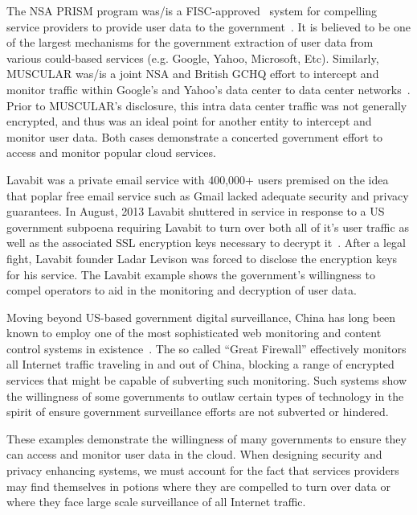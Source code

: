 \begin{packed_desc}
\item[PRISM and MUSCULAR:] The NSA PRISM program was/is a
  FISC-approved~\cite{fisc} system for compelling service providers to
  provide user data to the government~\cite{greenwald-prism}. It is
  believed to be one of the largest mechanisms for the government
  extraction of user data from various could-based services
  (e.g. Google, Yahoo, Microsoft, Etc). Similarly, MUSCULAR was/is a
  joint NSA and British GCHQ effort to intercept and monitor traffic
  within Google's and Yahoo's data center to data center
  networks~\cite{gellman-muscular}. Prior to MUSCULAR's disclosure,
  this intra data center traffic was not generally encrypted, and thus
  was an ideal point for another entity to intercept and monitor user
  data. Both cases demonstrate a concerted government effort to access
  and monitor popular cloud services.
\item[Lavabit:] Lavabit was a private email service with 400,000+
  users premised on the idea that poplar free email service such as
  Gmail lacked adequate security and privacy guarantees. In August,
  2013 Lavabit shuttered in service in response to a US government
  subpoena requiring Lavabit to turn over both all of it's user
  traffic as well as the associated SSL encryption keys necessary to
  decrypt it~\cite{lavabit, levsion-lavabit}. After a legal fight,
  Lavabit founder Ladar Levison was forced to disclose the encryption
  keys for his service. The Lavabit example shows the government's
  willingness to compel operators to aid in the monitoring and
  decryption of user data.
\item[The Great Firewall:] Moving beyond US-based government digital
  surveillance, China has long been known to employ one of the most
  sophisticated web monitoring and content control systems in
  existence~\cite{rsf-china}. The so called ``Great Firewall''
  effectively monitors all Internet traffic traveling in and out of
  China, blocking a range of encrypted services that might be capable
  of subverting such monitoring. Such systems show the willingness of
  some governments to outlaw certain types of technology in the spirit
  of ensure government surveillance efforts are not subverted or
  hindered.
\end{packed_desc}

These examples demonstrate the willingness of many governments to
ensure they can access and monitor user data in the cloud. When
designing security and privacy enhancing systems, we must account for
the fact that services providers may find themselves in potions where
they are compelled to turn over data or where they face large scale
surveillance of all Internet traffic.

